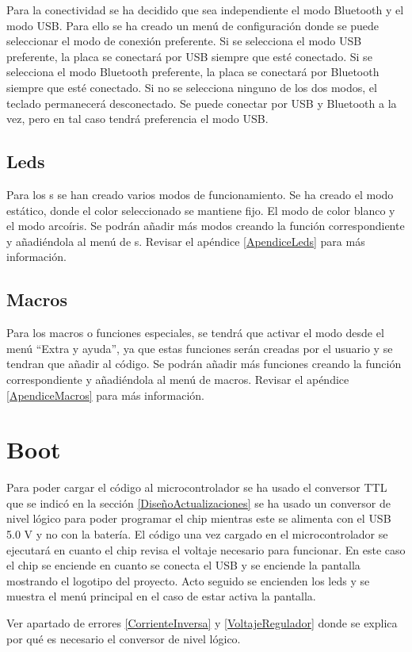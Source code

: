 Para la conectividad se ha decidido que sea independiente el modo \gls{Bluetooth} y el modo \gls{USB}. Para ello se ha creado un menú de configuración donde se puede seleccionar el modo de conexión preferente. Si se selecciona el modo \gls{USB} preferente, la placa se conectará por \gls{USB} siempre que esté conectado. Si se selecciona el modo \gls{Bluetooth} preferente, la placa se conectará por \gls{Bluetooth} siempre que esté conectado. Si no se selecciona ninguno de los dos modos, el teclado permanecerá desconectado. Se puede conectar por \gls{USB} y \gls{Bluetooth} a la vez, pero en tal caso tendrá preferencia el modo \gls{USB}.

\subsection{Leds}

Para los s se han creado varios modos de funcionamiento. Se ha creado el modo estático, donde el color seleccionado se mantiene fijo. El modo de color blanco y el modo arcoíris. Se podrán añadir más modos creando la función correspondiente y añadiéndola al menú de s. Revisar el apéndice \ref{ApendiceLeds} para más información.

\subsection{Macros}

Para los macros o funciones especiales, se tendrá que activar el modo desde el menú ``Extra y ayuda'', ya que estas funciones serán creadas por el usuario y se tendran que añadir al código. Se podrán añadir más funciones creando la función correspondiente y añadiéndola al menú de macros. Revisar el apéndice \ref{ApendiceMacros} para más información.

\section{Boot}

Para poder cargar el código al microcontrolador se ha usado el conversor \gls{TTL} que se indicó en la sección \ref{DiseñoActualizaciones} se ha usado un conversor de nivel lógico para poder programar el chip mientras este se alimenta con el \gls{USB} 5.0 V y no con la batería.
El código una vez cargado en el microcontrolador se ejecutará en cuanto el chip revisa el voltaje necesario para funcionar. En este caso el chip se enciende en cuanto se conecta el \gls{USB} y se enciende la pantalla mostrando el logotipo del proyecto. Acto seguido se encienden los leds y se muestra el menú principal en el caso de estar activa la pantalla.

\begin{tcolorbox}[colback=red!11!white, colframe=red!50!white, title=Errores]
    Ver apartado de errores \ref{CorrienteInversa} y \ref{VoltajeRegulador} donde se explica por qué es necesario el conversor de nivel lógico.
\end{tcolorbox}